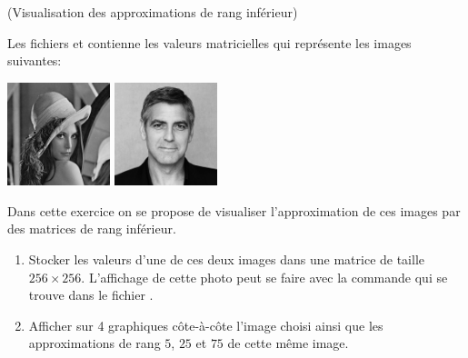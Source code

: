 \documentclass[a4paper,12pt,reqno]{amsart}
\begin{document}
\begin{exo} (Visualisation des approximations de rang inférieur)

  Les fichiers  et  contienne les valeurs matricielles qui représente les images suivantes:

  \begin{center}
    \includegraphics[width=3cm]{lena} \qquad \includegraphics[width=3cm]{george}
  \end{center}

  Dans cette exercice on se propose de visualiser l'approximation de ces images par des matrices de rang inférieur.
  \begin{enumerate}
    \item Stocker les valeurs d'une de ces deux images dans une matrice  de taille $256 \times 256$. L'affichage de cette photo peut se faire avec la commande  qui se trouve dans le fichier .

    \item Afficher sur 4 graphiques côte-à-côte l'image choisi ainsi que les approximations de rang $5$, $25$ et $75$ de cette même image.
  \end{enumerate}

\end{exo}

\end{document}
